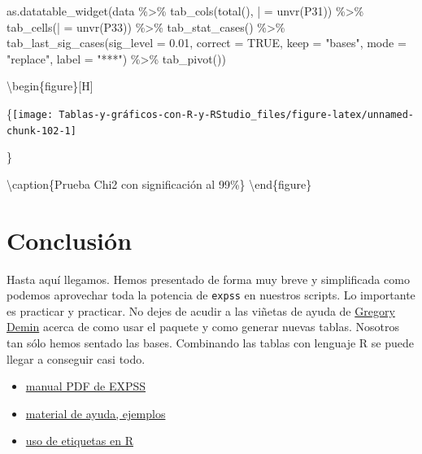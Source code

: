 \documentclass[
]{book}
\newenvironment{Shaded}{\begin{snugshade}}{\end{snugshade}}
\newcommand{\AttributeTok}[1]{\textcolor[rgb]{0.77,0.63,0.00}{#1}}
\newcommand{\ConstantTok}[1]{\textcolor[rgb]{0.00,0.00,0.00}{#1}}
\newcommand{\FloatTok}[1]{\textcolor[rgb]{0.00,0.00,0.81}{#1}}
\newcommand{\FunctionTok}[1]{\textcolor[rgb]{0.00,0.00,0.00}{#1}}
\newcommand{\NormalTok}[1]{#1}
\newcommand{\OtherTok}[1]{\textcolor[rgb]{0.56,0.35,0.01}{#1}}
\newcommand{\SpecialCharTok}[1]{\textcolor[rgb]{0.00,0.00,0.00}{#1}}
\newcommand{\StringTok}[1]{\textcolor[rgb]{0.31,0.60,0.02}{#1}}
\providecommand{\tightlist}{%
  \setlength{\itemsep}{0pt}\setlength{\parskip}{0pt}}
\begin{document}
\begin{Shaded}
\begin{Highlighting}[]
\FunctionTok{as.datatable\_widget}\NormalTok{(data }\SpecialCharTok{\%\textgreater{}\%} \FunctionTok{tab\_cols}\NormalTok{(}\FunctionTok{total}\NormalTok{(), }\StringTok{\textasciigrave{}}\AttributeTok{|}\StringTok{\textasciigrave{}} \OtherTok{=} \FunctionTok{unvr}\NormalTok{(P31)) }\SpecialCharTok{\%\textgreater{}\%} 
  \FunctionTok{tab\_cells}\NormalTok{(}\StringTok{\textasciigrave{}}\AttributeTok{|}\StringTok{\textasciigrave{}} \OtherTok{=} \FunctionTok{unvr}\NormalTok{(P33)) }\SpecialCharTok{\%\textgreater{}\%} \FunctionTok{tab\_stat\_cases}\NormalTok{() }\SpecialCharTok{\%\textgreater{}\%} \FunctionTok{tab\_last\_sig\_cases}\NormalTok{(}\AttributeTok{sig\_level =} \FloatTok{0.01}\NormalTok{, }
  \AttributeTok{correct =} \ConstantTok{TRUE}\NormalTok{, }\AttributeTok{keep =} \StringTok{"bases"}\NormalTok{, }\AttributeTok{mode =} \StringTok{"replace"}\NormalTok{, }\AttributeTok{label =} \StringTok{"***"}\NormalTok{) }\SpecialCharTok{\%\textgreater{}\%} 
  \FunctionTok{tab\_pivot}\NormalTok{())}
\end{Highlighting}
\end{Shaded}

\textbackslash begin\{figure\}{[}H{]}

\{\centering \texttt{[image: Tablas-y-gráficos-con-R-y-RStudio\_files/figure-latex/unnamed-chunk-102-1]}

\}

\textbackslash caption\{Prueba Chi2 con significación al 99\%\}\label{fig:unnamed-chunk-102}
\textbackslash end\{figure\}

\hypertarget{conclusiuxf3n-2}{%
\section{Conclusión}\label{conclusiuxf3n-2}}

Hasta aquí llegamos. Hemos presentado de forma muy breve y simplificada como podemos aprovechar toda la potencia de \texttt{expss} en nuestros scripts. Lo importante es practicar y practicar. No dejes de acudir a las viñetas de ayuda de \href{http://gdemin.github.io/expss/}{Gregory Demin} acerca de como usar el paquete y como generar nuevas tablas. Nosotros tan sólo hemos sentado las bases. Combinando las tablas con lenguaje R se puede llegar a conseguir casi todo.

\begin{itemize}
\tightlist
\item
  \href{https://cran.r-project.org/web/packages/expss/expss.pdf}{manual PDF de EXPSS}
\item
  \href{https://cran.r-project.org/web/packages/expss/vignettes/tables-with-labels.html}{material de ayuda, ejemplos}
\item
  \href{https://cran.r-project.org/web/packages/expss/vignettes/labels-support.html}{uso de etiquetas en R}
\end{itemize}
\end{document}
